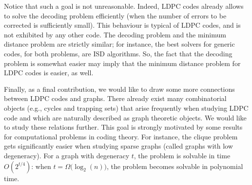 Notice that such a goal is not unreasonable.
Indeed, LDPC codes already allows to solve the decoding problem efficiently (when the number of errors to be corrected is sufficiently small).
This behaviour is typical of LDPC codes, and is not exhibited by any other code.
The decoding problem and the minimum distance problem are strictly similar; for instance, the best solvers for generic codes, for both problems, are ISD algorithms.
So, the fact that the decoding problem is somewhat easier may imply that the minimum distance problem for LDPC codes is easier, as well.

Finally, as a final contribution, we would like to draw some more connections between LDPC codes and graphs.
There already exist many combinatorial objects (e.g., cycles and trapping sets) that arise frequently when studying LDPC code and which are naturally described as graph theoretic objects.
We would like to study these relations further.
This goal is strongly motivated by some results  for computational problems in coding theory.
For instance, the clique problem gets significantly easier when studying sparse graphs (called graphs with low degeneracy).
For a graph with degeneracy $t$, the problem is solvable in time $O(2^{t/4})$: when $t = \Omega\big(\log_2(n)\big)$, the problem becomes solvable in polynomial time.

